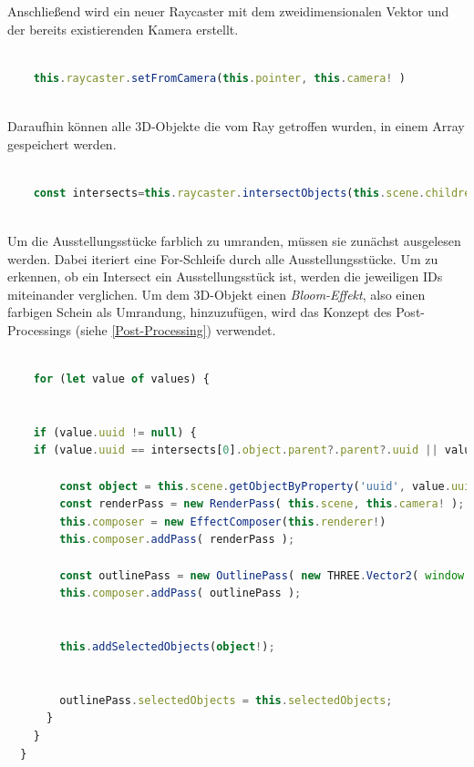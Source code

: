 Anschließend wird ein neuer Raycaster mit dem zweidimensionalen Vektor und der bereits existierenden Kamera erstellt. 

\begin{lstlisting}[caption={Neuen Raycaster anlegen},language=TypeScript]
    
    this.raycaster.setFromCamera(this.pointer, this.camera! )
    
\end{lstlisting}

Daraufhin können alle 3D-Objekte die vom Ray getroffen wurden, in einem Array gespeichert werden.

\begin{lstlisting}[caption={Intersected Objects auslesen},language=TypeScript]
    
    const intersects=this.raycaster.intersectObjects(this.scene.children)
    
\end{lstlisting}

Um die Ausstellungsstücke farblich zu umranden, müssen sie zunächst ausgelesen werden. Dabei iteriert eine For-Schleife durch alle Ausstellungsstücke. Um zu erkennen, ob ein Intersect ein Ausstellungsstück ist, werden die jeweiligen IDs miteinander verglichen. Um dem 3D-Objekt einen \emph{Bloom-Effekt}, also einen farbigen Schein als Umrandung, hinzuzufügen, wird das Konzept des Post-Processings (siehe \ref{Post-Processing}) verwendet.

\begin{lstlisting}[caption={Intersects als Ausstellungsstück identifizieren},language=TypeScript]
    
    for (let value of values) {


    if (value.uuid != null) {
    if (value.uuid == intersects[0].object.parent?.parent?.uuid || value.uuid == intersects[0].object.uuid) {

        const object = this.scene.getObjectByProperty('uuid', value.uuid);
        const renderPass = new RenderPass( this.scene, this.camera! );
        this.composer = new EffectComposer(this.renderer!)
        this.composer.addPass( renderPass );
    
        const outlinePass = new OutlinePass( new THREE.Vector2( window.innerWidth, window.innerHeight ), this.scene, this.camera! );
        this.composer.addPass( outlinePass );


        this.addSelectedObjects(object!);


        outlinePass.selectedObjects = this.selectedObjects;
      }
    }
  }

\end{lstlisting}

